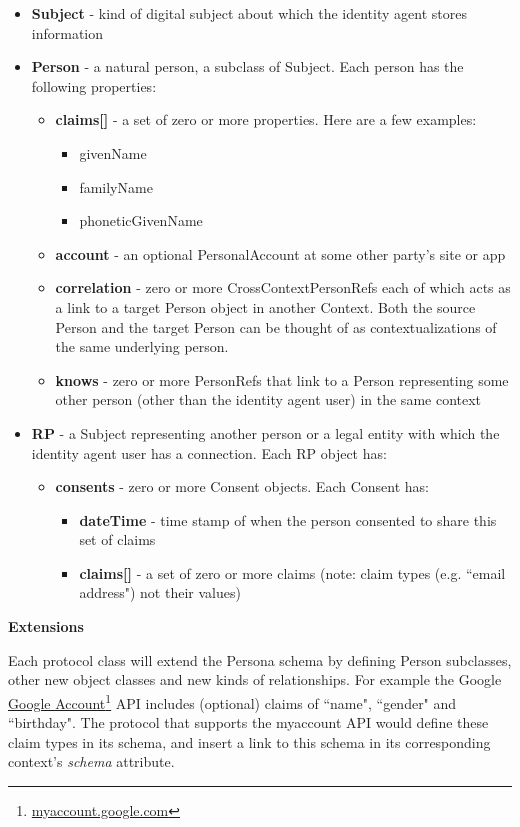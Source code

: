 \documentclass[11pt, oneside]{article}   	%
\newcommand{\hyperfootnote}[1][]{\def\ArgI{{#1}}\hyperfootnoteRelay}
\newcommand\hyperfootnoteRelay[2][]{\href{#1#2}{\ArgI}\footnote{\href{#1#2}{#2}}}
\begin{document}
\begin{itemize}
\item \textbf{Subject} - kind of digital subject about which the identity agent stores information
\item \textbf{Person} - a natural person, a subclass of Subject. Each person has the following properties:
	\begin{itemize}
	\item \textbf{claims[]} - a set of zero or more properties. Here are a few examples: 
		\begin{itemize}
		\item givenName
		\item familyName
		\item phoneticGivenName
		\end{itemize}
	\item \textbf{account} - an optional PersonalAccount at some other party's site or app
	\item \textbf{correlation} - zero or more CrossContextPersonRefs each of which acts as a link to a target Person object in another Context. Both the source Person and the target Person can be thought of as contextualizations of the same underlying person.
	\item \textbf{knows} - zero or more PersonRefs that link to a Person representing some other person (other than the identity agent user) in the same context
	\end{itemize}
\item \textbf{RP} - a Subject representing another person or a legal entity with which the identity agent user has a connection. Each RP object has:
	\begin {itemize}
	\item \textbf{consents} - zero or more Consent objects. Each Consent has:
		\begin{itemize}
		\item \textbf{dateTime} - time stamp of when the person consented to share this set of claims
		\item \textbf{claims[]}  - a set of zero or more claims (note: claim types (e.g. ``email address") not their values)
		\end{itemize}
	\end{itemize}
\end{itemize}

\textbf{Extensions}

Each protocol class will extend the Persona schema by defining Person subclasses, other new object classes and new kinds of relationships. For example the Google
\hyperfootnote[Google Account][https://]{myaccount.google.com}  API includes (optional) claims of ``name", ``gender" and ``birthday". The protocol that supports the myaccount API would define these claim types in its schema, and insert a link to this schema in its corresponding context's \emph{schema} attribute.
\end{document}

